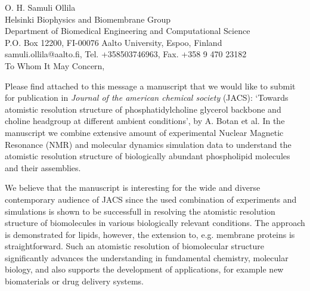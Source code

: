 \documentclass[12pt]{letter}
\begin{document}
\reversemarginpar
\pagestyle{empty}
\noindent O. H. Samuli Ollila \\
\noindent Helsinki Biophysics and Biomembrane Group\\
\noindent Department of Biomedical Engineering and Computational Science\\
\noindent P.O. Box 12200, FI-00076 Aalto University, Espoo, Finland\\
\noindent samuli.ollila@aalto.fi, Tel. +358503746963, Fax. +358 9 470 23182 \\


%
%

To Whom It May Concern,

Please find attached to this message a manuscript that we would like to submit for publication 
in \textit{Journal of the american chemical society} (JACS): 
`Towards atomistic resolution structure of phosphatidylcholine glycerol backbone and choline headgroup at different ambient conditions', 
by A. Botan et al. In the manuscript we combine extensive amount of experimental Nuclear Magnetic Resonance (NMR)
and molecular dynamics simulation data to understand the atomistic resolution structure of biologically abundant phospholipid molecules and their assemblies.

We believe that the manuscript is interesting for the wide and diverse contemporary audience of
JACS since the used combination of experiments and simulations is shown to be successfull in
resolving the atomistic resolution structure of biomolecules in various biologically relevant conditions.
The approach is demonstrated for lipids, however, the extension to, e.g. membrane proteins is straightforward. 
Such an atomistic resolution of  biomolecular structure
significantly advances the understanding in fundamental chemistry, molecular biology, and also supports the development of applications, 
for example new biomaterials or drug delivery systems.
\end{document}
